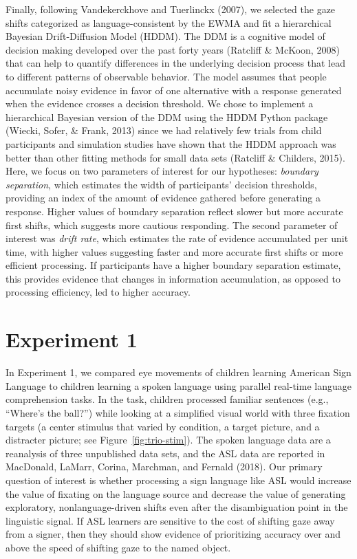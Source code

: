 \documentclass[,man,floatsintext]{apa6}
\begin{document}
Finally, following Vandekerckhove and Tuerlinckx (2007), we selected the gaze shifts categorized as language-consistent by the EWMA and fit a hierarchical Bayesian Drift-Diffusion Model (HDDM). The DDM is a cognitive model of decision making developed over the past forty years (Ratcliff \& McKoon, 2008) that can help to quantify differences in the underlying decision process that lead to different patterns of observable behavior. The model assumes that people accumulate noisy evidence in favor of one alternative with a response generated when the evidence crosses a decision threshold. We chose to implement a hierarchical Bayesian version of the DDM using the HDDM Python package (Wiecki, Sofer, \& Frank, 2013) since we had relatively few trials from child participants and simulation studies have shown that the HDDM approach was better than other fitting methods for small data sets (Ratcliff \& Childers, 2015). Here, we focus on two parameters of interest for our hypotheses: \emph{boundary separation}, which estimates the width of participants' decision thresholds, providing an index of the amount of evidence gathered before generating a response. Higher values of boundary separation reflect slower but more accurate first shifts, which suggests more cautious responding. The second parameter of interest was \emph{drift rate}, which estimates the rate of evidence accumulated per unit time, with higher values suggesting faster and more accurate first shifts or more efficient processing. If participants have a higher boundary separation estimate, this provides evidence that changes in information accumulation, as opposed to processing efficiency, led to higher accuracy.

\hypertarget{experiment-1}{%
\section{Experiment 1}\label{experiment-1}}

In Experiment 1, we compared eye movements of children learning American Sign Language to children learning a spoken language using parallel real-time language comprehension tasks. In the task, children processed familiar sentences (e.g., \enquote{Where's the ball?}) while looking at a simplified visual world with three fixation targets (a center stimulus that varied by condition, a target picture, and a distracter picture; see Figure~\ref{fig:trio-stim}). The spoken language data are a reanalysis of three unpublished data sets, and the ASL data are reported in MacDonald, LaMarr, Corina, Marchman, and Fernald (2018). Our primary question of interest is whether processing a sign language like ASL would increase the value of fixating on the language source and decrease the value of generating exploratory, nonlanguage-driven shifts even after the disambiguation point in the linguistic signal. If ASL learners are sensitive to the cost of shifting gaze away from a signer, then they should show evidence of prioritizing accuracy over and above the speed of shifting gaze to the named object.
\end{document}

